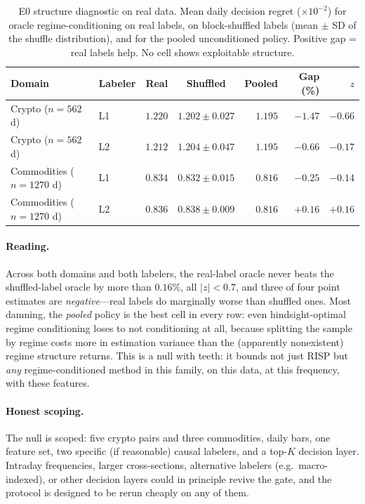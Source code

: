 \begin{table}[h]
\centering
\caption{E0 structure diagnostic on real data. Mean daily decision regret
($\times 10^{-2}$) for oracle regime-conditioning on real labels, on
block-shuffled labels (mean $\pm$ SD of the shuffle distribution), and for
the pooled unconditioned policy. Positive gap = real labels help. No cell
shows exploitable structure.}
\label{tab:dd5-e0}
\small
\begin{tabular}{llccrrr}
\toprule
Domain & Labeler & Real & Shuffled & Pooled & Gap (\%) & $z$ \\
\midrule
Crypto ($n{=}562$ d) & L1 & $1.220$ & $1.202 \pm 0.027$ & $1.195$ & $-1.47$ & $-0.66$ \\
Crypto ($n{=}562$ d) & L2 & $1.212$ & $1.204 \pm 0.047$ & $1.195$ & $-0.66$ & $-0.17$ \\
Commodities ($n{=}1270$ d) & L1 & $0.834$ & $0.832 \pm 0.015$ & $0.816$ & $-0.25$ & $-0.14$ \\
Commodities ($n{=}1270$ d) & L2 & $0.836$ & $0.838 \pm 0.009$ & $0.816$ & $+0.16$ & $+0.16$ \\
\bottomrule
\end{tabular}
\end{table}

\paragraph{Reading.} Across both domains and both labelers, the real-label
oracle never beats the shuffled-label oracle by more than $0.16\%$, all
$|z| < 0.7$, and three of four point estimates are \emph{negative}---real
labels do marginally worse than shuffled ones. Most damning, the
\emph{pooled} policy is the best cell in every row: even hindsight-optimal
regime conditioning loses to not conditioning at all, because splitting the
sample by regime costs more in estimation variance than the (apparently
nonexistent) regime structure returns. This is a null with teeth: it bounds
not just RISP but \emph{any} regime-conditioned method in this family,
on this data, at this frequency, with these features.

\paragraph{Honest scoping.} The null is scoped: five crypto pairs and three
commodities, daily bars, one feature set, two specific (if reasonable)
causal labelers, and a top-$K$ decision layer. Intraday frequencies, larger
cross-sections, alternative labelers (e.g.\ macro-indexed), or other
decision layers could in principle revive the gate, and the protocol is
designed to be rerun cheaply on any of them.

